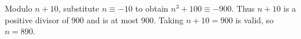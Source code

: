 Modulo $n+10$, substitute $n\equiv-10$ to obtain $n^3+100\equiv-900$. Thus $n+10$ is a positive divisor of 900 and is at most 900. Taking $n+10=900$ is valid, so $\boxed{n=890}$.
